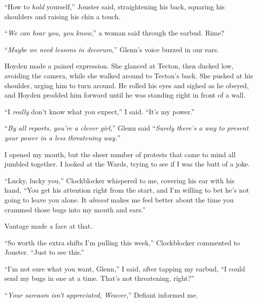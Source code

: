 ``How to \emph{hold} yourself,'' Jouster said, straightening his back, squaring his shoulders and raising his chin a touch.



``\emph{We can hear you, you know},'' a woman said through the earbud.  Rime?



``\emph{Maybe we need lessons in decorum,}'' Glenn's voice buzzed in our ears.



Hoyden made a pained expression.  She glanced at Tecton, then ducked low, avoiding the camera, while she walked around to Tecton's back.  She pushed at his shoulder, urging him to turn around.  He rolled his eyes and sighed as he obeyed, and Hoyden prodded him forward until he was standing right in front of a wall.



``I \emph{really} don't know what you expect,'' I said.  ``It's my power.''



``\emph{By all reports, you're a clever girl},'' Glenn said  ``\emph{Surely there's a way to present your power in a less threatening way.}''



I opened my mouth, but the sheer number of protests that came to mind all jumbled together.  I looked at the Wards, trying to see if I was the butt of a joke.



``Lucky, lucky you,'' Clockblocker whispered to me, covering his ear with his hand, ``You get his attention right from the start, and I'm willing to bet he's not going to leave you alone.  It \emph{almost} makes me feel better about the time you crammed those bugs into my mouth and ears.''



Vantage made a face at that.



``So worth the extra shifts I'm pulling this week,'' Clockblocker commented to Jouster.  ``Just to see this.''



``I'm not sure what you want, Glenn,'' I said, after tapping my earbud,  ``I could send my bugs in one at a time.  That's not threatening, right?''



``\emph{Your sarcasm isn't appreciated, Weaver,}'' Defiant informed me.



